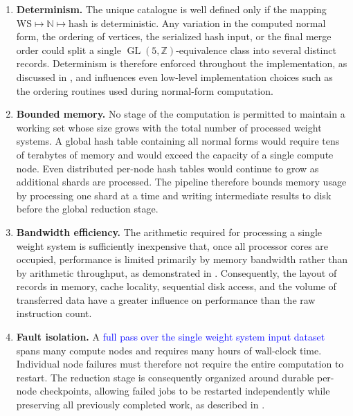 \documentclass[appliedmath,article,submit,moreauthors]{Definitions/mdpi}
\newcommand{\Z}{\mathbb{Z}}
\newcommand{\GL}{\operatorname{GL}}
\newcommand{\NF}{\mathbb{N}}
\begin{document}
\begin{enumerate}

\item \textbf{Determinism.} The unique catalogue is well defined only if the
mapping \(\mathrm{WS}\mapsto\NF\mapsto\mathrm{hash}\) is deterministic. Any
variation in the computed normal form, the ordering of vertices, the serialized
hash input, or the final merge order could split a single
\(\GL(5,\Z)\)-equivalence class into several distinct records. Determinism is
therefore enforced throughout the implementation, as discussed in
, and influences even low-level implementation
choices such as the ordering routines used during normal-form computation.

\item \textbf{Bounded memory.} No stage of the computation is permitted to
maintain a working set whose size grows with the total number of processed
weight systems. A global hash table containing all normal forms would require
tens of terabytes of memory and would exceed the capacity of a single compute
node. Even distributed per-node hash tables would continue to grow as additional
shards are processed. The pipeline therefore bounds memory usage by processing
one shard at a time and writing intermediate results to disk before the global
reduction stage.

\item \textbf{Bandwidth efficiency.} The arithmetic required for processing a
single weight system is sufficiently inexpensive that, once all processor cores
are occupied, performance is limited primarily by memory bandwidth rather than
by arithmetic throughput, as demonstrated in . Consequently,
the layout of records in memory, cache locality, sequential disk access, and the
volume of transferred data have a greater influence on performance than the raw
instruction count.

\item \textbf{Fault isolation.} A \textcolor{blue}{full pass over the
single weight system input dataset} spans many compute
nodes and requires many hours of wall-clock time. Individual node failures must
therefore not require the entire computation to restart. The reduction stage is
consequently organized around durable per-node checkpoints, allowing failed jobs
to be restarted independently while preserving all previously completed work, as
described in .

\end{enumerate}
\end{document}
